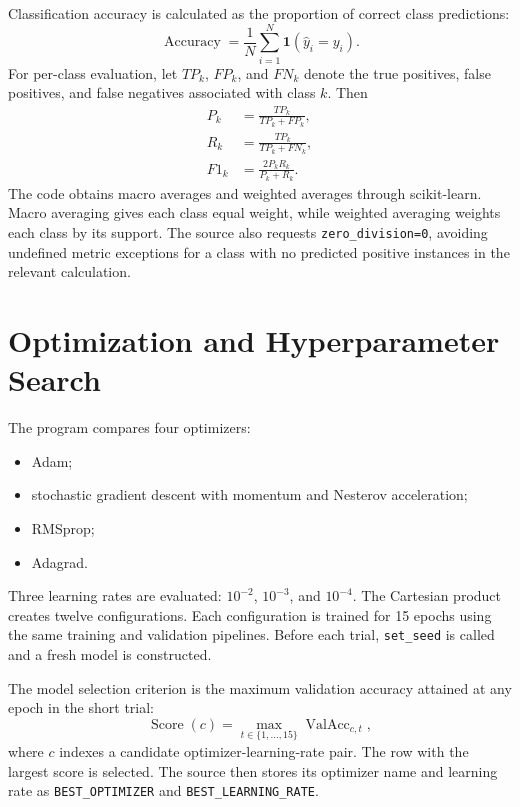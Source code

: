 \documentclass[11pt,a4paper]{article}
\newcommand{\code}[1]{\texttt{#1}}
\begin{document}
Classification accuracy is calculated as the proportion of correct class predictions:
\begin{equation}
\operatorname{Accuracy}
=
\frac{1}{N}\sum_{i=1}^{N}\mathbf{1}\left(\hat{y}_i=y_i\right).
\end{equation}
For per-class evaluation, let $TP_k$, $FP_k$, and $FN_k$ denote the true positives, false positives, and false negatives associated with class $k$. Then
\begin{align}
P_k &= \frac{TP_k}{TP_k+FP_k},\\
R_k &= \frac{TP_k}{TP_k+FN_k},\\
F1_k &= \frac{2P_kR_k}{P_k+R_k}.
\end{align}
The code obtains macro averages and weighted averages through scikit-learn. Macro averaging gives each class equal weight, while weighted averaging weights each class by its support. The source also requests \code{zero\_division=0}, avoiding undefined metric exceptions for a class with no predicted positive instances in the relevant calculation.

\section{Optimization and Hyperparameter Search}
The program compares four optimizers:
\begin{itemize}[leftmargin=1.7em]
\item Adam;
\item stochastic gradient descent with momentum and Nesterov acceleration;
\item RMSprop;
\item Adagrad.
\end{itemize}
Three learning rates are evaluated: $10^{-2}$, $10^{-3}$, and $10^{-4}$. The Cartesian product creates twelve configurations. Each configuration is trained for 15 epochs using the same training and validation pipelines. Before each trial, \code{set\_seed} is called and a fresh model is constructed.

The model selection criterion is the maximum validation accuracy attained at any epoch in the short trial:
\begin{equation}
\operatorname{Score}(c)=\max_{t\in\{1,\ldots,15\}} \operatorname{ValAcc}_{c,t},
\end{equation}
where $c$ indexes a candidate optimizer-learning-rate pair. The row with the largest score is selected. The source then stores its optimizer name and learning rate as \code{BEST\_OPTIMIZER} and \code{BEST\_LEARNING\_RATE}.
\end{document}
